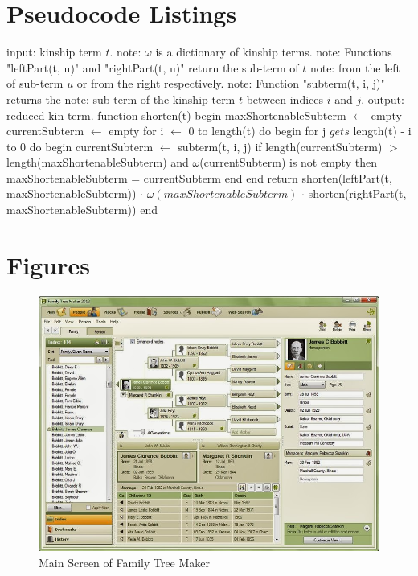 \appendix
\chapter{Pseudocode Listings}
\begin{algorithm}[caption={Kinship Term Reduction}, label={algo:red}]
    input: kinship term $t$.
    note: $\omega$ is a dictionary of kinship terms.
    note: Functions "leftPart(t, u)" and "rightPart(t, u)" return the sub-term of $t$
    note: from the left of sub-term $u$ or from the right respectively.
    note: Function "subterm(t, i, j)" returns the
    note: sub-term of the kinship term $t$ between indices $i$ and $j$.
    output: reduced kin term.
    function shorten(t)
    begin
        maxShortenableSubterm $\gets$ empty
        currentSubterm $\gets$ empty
        for i $\gets$ 0 to length(t) do
        begin
            for j $gets$ length(t) - i to 0 do
            begin
                currentSubterm $\gets$ subterm(t, i, j)
                if length(currentSubterm) $>$ length(maxShortenableSubterm)
                    and $\omega$(currentSubterm) is not empty
                then
                    maxShortenableSubterm = currentSubterm
            end
        end
        return shorten(leftPart(t, maxShortenableSubterm))
               $\cdot$ $\omega(maxShortenableSubterm)$
               $\cdot$ shorten(rightPart(t, maxShortenableSubterm))
    end
\end{algorithm}

\chapter{Figures}
\begin{figure}
    \centering
    \includegraphics[width=\linewidth]{figs/ftmShot.png}
    \caption{Main Screen of Family Tree Maker}
    \label{fig:ftmShot}
\end{figure}

